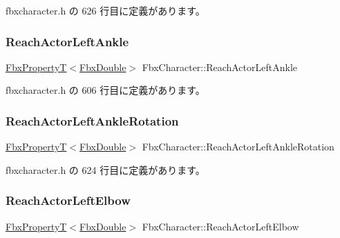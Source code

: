  fbxcharacter.\+h の 626 行目に定義があります。

\mbox{\label{class_fbx_character_aab13b47ce65203d4416c0d33784effe3}} 
\subsubsection{\texorpdfstring{Reach\+Actor\+Left\+Ankle}{ReachActorLeftAnkle}}
{\footnotesize\ttfamily \hyperlink{class_fbx_property_t}{Fbx\+PropertyT}$<$\hyperlink{fbxtypes_8h_a171e72a1c46fc15c1a6c9c31948c1c5b}{Fbx\+Double}$>$ Fbx\+Character\+::\+Reach\+Actor\+Left\+Ankle}



 fbxcharacter.\+h の 606 行目に定義があります。

\mbox{\label{class_fbx_character_a3e43185f058a2357766a526f9fba362f}} 
\subsubsection{\texorpdfstring{Reach\+Actor\+Left\+Ankle\+Rotation}{ReachActorLeftAnkleRotation}}
{\footnotesize\ttfamily \hyperlink{class_fbx_property_t}{Fbx\+PropertyT}$<$\hyperlink{fbxtypes_8h_a171e72a1c46fc15c1a6c9c31948c1c5b}{Fbx\+Double}$>$ Fbx\+Character\+::\+Reach\+Actor\+Left\+Ankle\+Rotation}



 fbxcharacter.\+h の 624 行目に定義があります。

\mbox{\label{class_fbx_character_aa87b8af4ec39d88b0fe5ff69c1a9072f}} 
\subsubsection{\texorpdfstring{Reach\+Actor\+Left\+Elbow}{ReachActorLeftElbow}}
{\footnotesize\ttfamily \hyperlink{class_fbx_property_t}{Fbx\+PropertyT}$<$\hyperlink{fbxtypes_8h_a171e72a1c46fc15c1a6c9c31948c1c5b}{Fbx\+Double}$>$ Fbx\+Character\+::\+Reach\+Actor\+Left\+Elbow}



